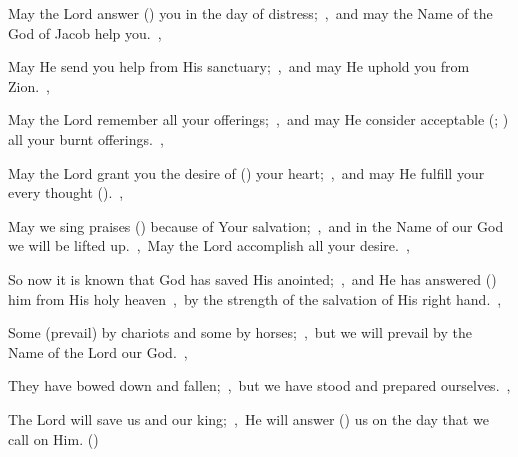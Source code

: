 \documentclass[12pt,twoside,a5paper]{article}
\begin{document}

\begin{normalparskip}
  May the Lord answer () you in the day of distress;~\sep\ and may the Name of the God of Jacob help you.~\sep


  May He send you help from His sanctuary;~\sep\ and may He uphold you from Zion.~\sep

  May the Lord remember all your offerings;~\sep\ and may He consider acceptable (; ) all your burnt offerings.~\sep

  May the Lord grant you the desire of () your heart;~\sep\ and may He fulfill your every thought ().~\sep

  May we sing praises () because of Your salvation;~\sep\ and in the Name of our God we will be lifted up.~\sep\ May the Lord accomplish all your desire.~\sep

  So now it is known that God has saved His anointed;~\sep\ and He has answered () him from His holy heaven~\sep\ by the strength of the salvation of His right hand.~\sep

  Some (prevail) by chariots and some by horses;~\sep\ but we will prevail by the Name of the Lord our God.~\sep

  They have bowed down and fallen;~\sep\ but we have stood and prepared ourselves.~\sep

  The Lord will save us and our king;~\sep\ He will answer () us on the day that we call on Him. ()
\end{normalparskip}

\end{document}
